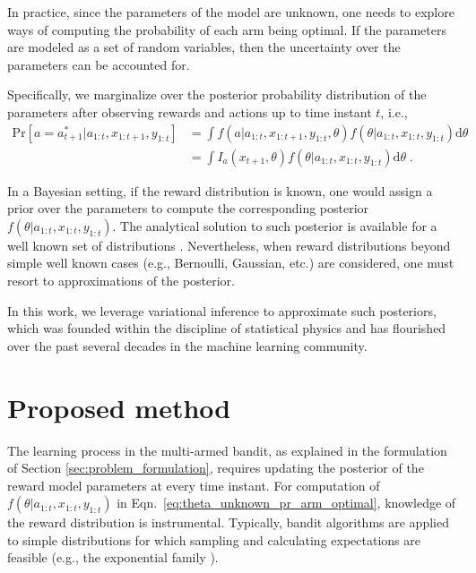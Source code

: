\documentclass{article}
\newcommand{\ie}{i.e., }
\newcommand{\eg}{e.g., }
\begin{document}
In practice, since the parameters of the model are unknown, one needs to explore ways of computing the probability of each arm being optimal. If the parameters are modeled as a set of random variables, then the uncertainty over the parameters can be accounted for.

Specifically, we marginalize over the posterior probability distribution of the parameters after observing rewards and actions up to time instant $t$, \ie
\begin{equation}
\begin{split}
\mathrm{Pr}\left[a=a_{t+1}^* \big| a_{1:t}, x_{1:t+1}, y_{1:t}\right] & = \int f(a|a_{1:t}, x_{1:t+1}, y_{1:t}, \theta) f(\theta|a_{1:t}, x_{1:t}, y_{1:t}) \mathrm{d}\theta \\
	& =\int I_a(x_{t+1}, \theta) f(\theta|a_{1:t}, x_{1:t}, y_{1:t}) \mathrm{d}\theta \; .
\end{split}
\label{eq:theta_unknown_pr_arm_optimal}
\end{equation}

In a Bayesian setting, if the reward distribution is known, one would assign a prior over the parameters to compute the corresponding posterior $f(\theta|a_{1:t}, x_{1:t}, y_{1:t})$. The analytical solution to such posterior is available for a well known set of distributions \cite{b-Bernardo2009}. Nevertheless, when reward distributions beyond simple well known cases (\eg Bernoulli, Gaussian, etc.) are considered, one must resort to approximations of the posterior.

In this work, we leverage variational inference to approximate such posteriors, which was founded within the discipline of statistical physics and has flourished over the past several decades in the machine learning community. 

\section{Proposed method}
\label{sec:proposed_method}

The learning process in the multi-armed bandit, as explained in the formulation of Section \ref{sec:problem_formulation}, requires updating the posterior of the reward model parameters at every time instant. For computation of $f(\theta|a_{1:t}, x_{1:t}, y_{1:t})$ in Eqn.~\eqref{eq:theta_unknown_pr_arm_optimal}, knowledge of the reward distribution is instrumental. Typically, bandit algorithms are applied to simple distributions for which sampling and calculating expectations are feasible (\eg the exponential family \cite{ic-Korda2013}).
\end{document}
